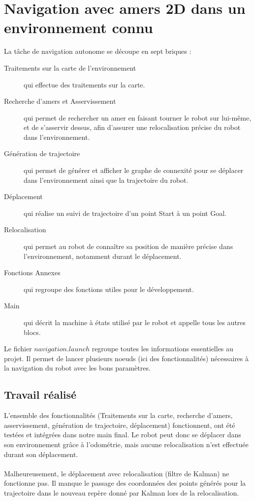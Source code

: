 \documentclass[10pt,a4paper]{article}
\begin{document}
\section{Navigation avec amers 2D dans un environnement connu}
\label{sec:navigation_avec_amers_2D_dans_un_environnement_connu}

La tâche de navigation autonome se découpe en sept briques : 
\begin{description}
\item [Traitements sur la carte de l'environnement] qui effectue des traitements sur la carte.
\item [Recherche d'amers et Asservissement] qui permet de rechercher un amer en faisant tourner le robot sur lui-même, et de s'asservir dessus, afin d'assurer une relocalisation précise du robot dans l'environnement.
\item [Génération de trajectoire] qui permet de générer et afficher le graphe de connexité pour se déplacer dans l'environnement ainsi que la trajectoire du robot.
\item [Déplacement] qui réalise un suivi de trajectoire d'un point Start à un point Goal.
\item [Relocalisation] qui permet au robot de connaître sa position de manière précise dans l'environnement, notamment durant le déplacement.
\item [Fonctions Annexes] qui regroupe des fonctions utiles pour le développement.
\item [Main] qui décrit la machine à états utilisé par le robot et appelle tous les autres blocs.
\end{description}


Le fichier $navigation.launch$ regroupe toutes les informations essentielles au projet. Il permet de lancer plusieurs noeuds (ici des fonctionnalités) nécessaires à la navigation du robot avec les bons paramètres.


\subsection{Travail réalisé}
\label{sec:travail_realise}

L'ensemble des fonctionnalités (Traitements sur la carte, recherche d'amers, asservissement, génération de trajectoire, déplacement) fonctionnent, ont été testées et intégrées dans notre main final. Le robot peut donc se déplacer dans son environnement grâce à l'odométrie, mais aucune relocalisation n'est effectuée durant son déplacement.\\\\
Malheureusement, le déplacement avec relocalisation (filtre de Kalman) ne fonctionne pas. Il manque le passage des coordonnées des points générés pour la trajectoire dans le nouveau repère donné par Kalman lors de la relocalisation.
\end{document}

